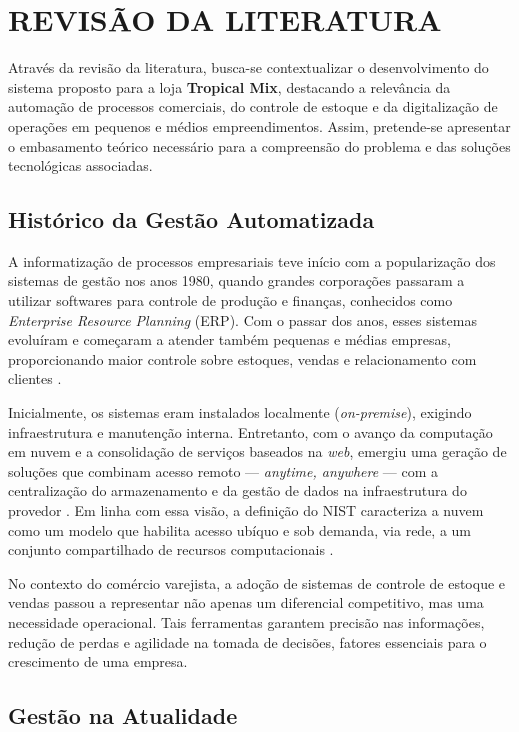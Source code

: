 \chapter{REVISÃO DA LITERATURA}

Através da revisão da literatura, busca-se contextualizar o desenvolvimento do sistema proposto para a loja \textbf{Tropical Mix}, destacando a relevância da automação de processos comerciais, do controle de estoque e da digitalização de operações em pequenos e médios empreendimentos. Assim, pretende-se apresentar o embasamento teórico necessário para a compreensão do problema e das soluções tecnológicas associadas.

\section{Histórico da Gestão Automatizada}

A informatização de processos empresariais teve início com a popularização dos sistemas de gestão nos anos 1980, quando grandes corporações passaram a utilizar softwares para controle de produção e finanças, conhecidos como \textit{Enterprise Resource Planning} (ERP). Com o passar dos anos, esses sistemas evoluíram e começaram a atender também pequenas e médias empresas, proporcionando maior controle sobre estoques, vendas e relacionamento com clientes \cite{laudon2022}.

Inicialmente, os sistemas eram instalados localmente (\textit{on-premise}), exigindo infraestrutura e manutenção interna. Entretanto, com o avanço da computação em nuvem e a consolidação de serviços baseados na \textit{web}, emergiu uma geração de soluções que combinam acesso remoto — \textit{anytime, anywhere} — com a centralização do armazenamento e da gestão de dados na infraestrutura do provedor \cite{armbrust2009}. Em linha com essa visão, a definição do NIST caracteriza a nuvem como um modelo que habilita acesso ubíquo e sob demanda, via rede, a um conjunto compartilhado de recursos computacionais \cite{mell2011}.

No contexto do comércio varejista, a adoção de sistemas de controle de estoque e vendas passou a representar não apenas um diferencial competitivo, mas uma necessidade operacional. Tais ferramentas garantem precisão nas informações, redução de perdas e agilidade na tomada de decisões, fatores essenciais para o crescimento de uma empresa.

\section{Gestão na Atualidade}

